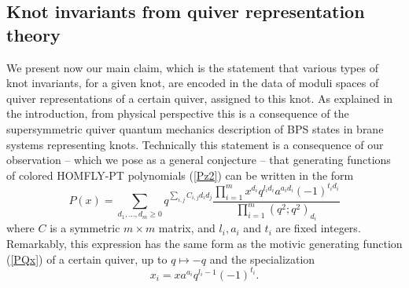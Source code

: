 \documentclass[
 reprint,
 amsmath,amssymb,
 aps,prl
]{revtex4-1}
\newcommand{\be}{\begin{equation}}
\newcommand{\ee}{\end{equation}}
\begin{document}

\subsection{Knot invariants from quiver representation theory}

We present now our main claim, which is the statement that various types of knot invariants, for a given knot, are encoded in the data of moduli spaces of quiver representations of a certain quiver, assigned to this knot. As explained in the introduction, from physical perspective this is a consequence of the supersymmetric quiver quantum mechanics description of BPS states in brane systems representing knots. Technically this statement is a consequence of our observation -- which we pose as a general conjecture -- that generating functions of colored HOMFLY-PT polynomials (\ref{Pz2}) can be written in the form
\be
P(x)  = \sum_{d_1,\ldots,d_m\geq 0} q^{\sum_{i,j} C_{i,j} d_i d_j}   \frac{\prod_{i=1}^m x^{d_i} q^{l_i d_i} a^{a_i d_i}(-1)^{t_i d_i}}{\prod_{i=1}^m(q^2;q^2)_{d_i}}  \label{PxC}
\ee
where $C$ is a symmetric $m\times m$ matrix, and $l_i,a_i$ and $t_i$ are fixed integers. Remarkably, this expression has the same form as the motivic generating function (\ref{PQx}) of a certain quiver, up to $q \mapsto -q$ and the specialization 
\be
x_i = x a^{a_i} q^{l_i - 1} (-1)^{t_i}.
\ee
\end{document}
